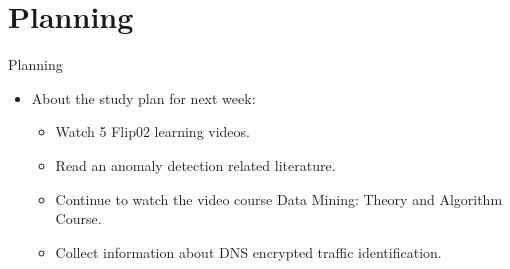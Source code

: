 \documentclass[
 size=14pt,
 paper=smartboard,  %
 mode=present, 		%
 display=slides, 	%
 style=tuliplab,  	%
 pauseslide,
 fleqn,leqno]{powerdot}
\begin{document}



\section{Planning}


\begin{slide}{Planning}





\begin{itemize}
  \item About the study plan for next week:\\
  \begin{itemize}
    \item Watch 5 Flip02 learning videos.\\
    \item Read an anomaly detection related literature.\\
    \item Continue to watch the video course Data Mining: Theory and Algorithm Course.\\
    \item Collect information about DNS encrypted traffic identification.\\
  \end{itemize}          
\end{itemize}



\end{slide}
\end{document}

